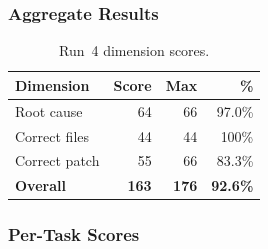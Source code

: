 \subsubsection{Aggregate Results}

\begin{table}[h]
\centering
\caption{Run~4 dimension scores.}\label{tab:r4-dim}
\begin{tabular}{lrrr}
\toprule
\textbf{Dimension} & \textbf{Score} & \textbf{Max} & \textbf{\%} \\
\midrule
Root cause         & 64 & 66 & 97.0\% \\
Correct files      & 44 & 44 & 100\%  \\
Correct patch      & 55 & 66 & 83.3\% \\
\midrule
\textbf{Overall}   & \textbf{163} & \textbf{176} & \textbf{92.6\%} \\
\bottomrule
\end{tabular}
\end{table}

\subsubsection{Per-Task Scores}

